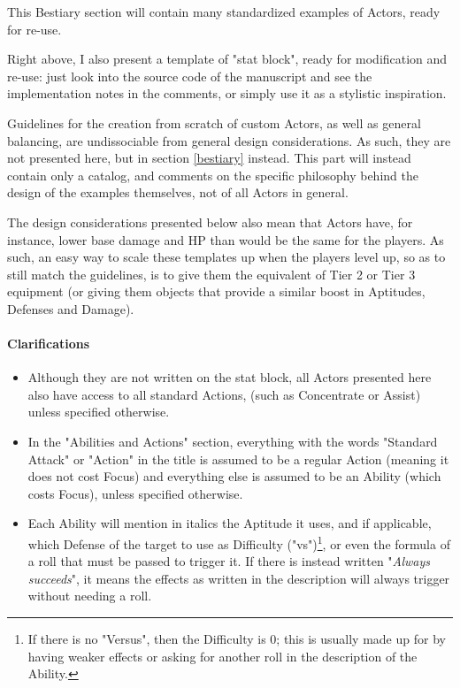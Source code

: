 This Bestiary section will contain many standardized examples of Actors, ready for re-use.

Right above, I also present a template of "stat block", ready for modification and re-use: just look into the source code of the manuscript and see the implementation notes in the comments, or simply use it as a stylistic inspiration.

\begin{rpg-examplebox}
    Guidelines for the creation from scratch of custom Actors, as well as general balancing, are undissociable from general design considerations. As such, they are not presented here, but in section \ref{bestiary} instead. This part will instead contain only a catalog, and comments on the specific philosophy behind the design of the examples themselves, not of all Actors in general.
\end{rpg-examplebox}

The design considerations presented below also mean that Actors have, for instance, lower base damage and HP than would be the same for the players. As such, an easy way to scale these templates up when the players level up, so as to still match the guidelines, is to give them the equivalent of Tier 2 or Tier 3 equipment (or giving them objects that provide a similar boost in Aptitudes, Defenses and Damage).

\paragraph{Clarifications}

\begin{itemize}
    \item Although they are not written on the stat block, all Actors presented here also have access to all standard Actions, (such as Concentrate or Assist) unless specified otherwise.
    \item In the "Abilities and Actions" section, everything with the words "Standard Attack" or "Action" in the title is assumed to be a regular Action (meaning it does not cost Focus) and everything else is assumed to be an Ability (which costs Focus), unless specified otherwise.
    \item Each Ability will mention in italics the Aptitude it uses, and if applicable, which Defense of the target to use as Difficulty ("vs")\footnote{If there is no "Versus", then the Difficulty is 0; this is usually made up for by having weaker effects or asking for another roll in the description of the Ability.}, or even the formula of a roll that must be passed to trigger it. If there is instead written "\textit{Always succeeds}", it means the effects as written in the description will always trigger without needing a roll.
\end{itemize}



